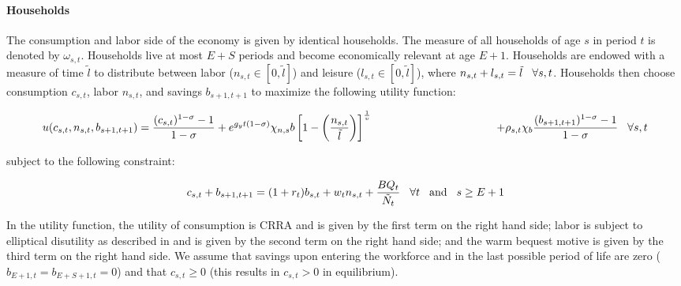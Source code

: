 \documentclass[10pt]{article}
\numberwithin{equation}{subsection}
\begin{document}
\begin{appendices}

\paragraph{Households}

\par The consumption and labor side of the economy is given by identical households. The measure of all households of age \(s\) in period \(t\) is denoted by \(\omega_{s,t}\). Households live at most \(E+S\) periods and become economically relevant at age \(E+1\). Households are endowed with a measure of time \(\tilde{l}\) to distribute between labor (\(n_{s,t} \in [0,\tilde{l}]\)) and leisure (\(l_{s,t} \in [0,\tilde{l}]\)), where \(n_{s,t} + l_{s,t} = \tilde{l} \hspace{3mm} \forall s, t\). Households then choose consumption \(c_{s,t}\), labor \(n_{s,t}\), and savings \(b_{s+1,t+1}\) to maximize the following utility function:

\begin{dmath}
   {u(c_{s,t}, n_{s,t}, b_{s+1,t+1}) = \frac{(c_{s,t})^{1-\sigma}-1}{1-\sigma} + e^{g_yt(1-\sigma)}\chi_{n,s}b\left[1-\left(\frac{n_{s,t}}{\tilde{l}}\right)\right]^{\frac{1}{\upsilon}}} \label{eq:hh_utility} \\
   {\hspace{40mm} + \rho_{s,t}\chi_b\frac{(b_{s+1,t+1})^{1-\sigma}-1}{1-\sigma} \hspace{3mm} \forall s,t}
\end{dmath}

\par subject to the following constraint:

\begin{equation}
   c_{s,t} + b_{s+1,t+1} = (1+r_t)b_{s,t} + w_tn_{s,t} + \frac{BQ_t}{\tilde{N}_t} \hspace{3mm} \forall t \hspace{3mm} \text{and} \hspace{3mm} s \geq E+1
\end{equation}

\par In the utility function, the utility of consumption is CRRA and is given by the first term on the right hand side; labor is subject to elliptical disutility as described in \cite{DE2018} and is given by the second term on the right hand side; and the warm bequest motive is given by the third term on the right hand side. We assume that savings upon entering the workforce and in the last possible period of life are zero (\(b_{E+1,t} = b_{E+S+1,t} = 0\)) and that \(c_{s,t} \geq 0\) (this results in \(c_{s,t} > 0\) in equilibrium).


\end{appendices}
\end{document}
